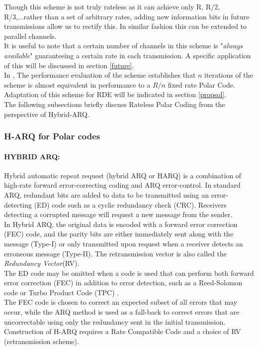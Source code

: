 \documentclass[
11pt, %
a4paper, %
oneside, %
headinclude,footinclude, %
BCOR5mm, %
]{scrartcl}
\begin{document}
Though this scheme is not truly rateless as it can achieve only R, R/2, R/3,...rather than a set of arbitrary rates, adding new information bits in future transmissions allow us to rectify this. In similar fashion this can be extended to parallel channels.\\
It is useful to note that a certain number of channels in this scheme is "\emph{always available}" guaranteeing a certain rate in each transmission. A specific application of this will be discussed in section \ref{future}.
\\In \cite{chen}, The performance evaluation of the scheme establishes that $n$ iterations of the scheme is almost equivalent in performance to a $R/n$ fixed rate Polar Code.
\\Adaptation of this scheme for RDE will be indicated in section \ref{propsol}.
\\The following subsections briefly discuss Rateless Polar Coding from the perspective of Hybrid-ARQ.
\subsubsection{H-ARQ for Polar codes}
\paragraph{HYBRID ARQ:}Hybrid automatic repeat request (hybrid ARQ or HARQ) is a combination of high-rate forward error-correcting coding and ARQ error-control. In standard ARQ, redundant bits are added to data to be transmitted using an error-detecting (ED) code such as a cyclic redundancy check (CRC). Receivers detecting a corrupted message will request a new message from the sender. \\In Hybrid ARQ, the original data is encoded with a forward error correction (FEC) code, and the parity bits are either immediately sent along with the message (Type-I) or only transmitted upon request when a receiver detects an erroneous message (Type-II). The retransmission vector is also called the \emph{Redundancy Vector}(RV). \\The ED code may be omitted when a code is used that can perform both forward error correction (FEC) in addition to error detection, such as a Reed-Solomon code or  Turbo Product Code (TPC) \cite{harqmukhtar}.\\The FEC code is chosen to correct an expected subset of all errors that may occur, while the ARQ method is used as a fall-back to correct errors that are uncorrectable using only the redundancy sent in the initial transmission.\\Construction of H-ARQ requires a Rate Compatible Code and a choice of RV (retransmission scheme).
\end{document}
